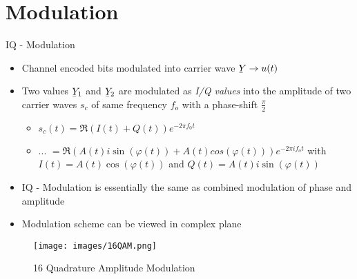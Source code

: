 \documentclass[xcolor=table,mathserif,9pt]{beamer}    %
\newcommand{\ubar}[1]{\underaccent{\bar}{#1}}
\begin{document}
\section{Modulation}%
\begin{frame}{IQ - Modulation}

\begin{itemize}
	\item Channel encoded bits modulated into carrier wave $\ubar{Y} \to u(t)$
	\item Two values $\ubar{Y}_1$ and $\ubar{Y}_2$ are modulated as \emph{I/Q values} into the amplitude of two carrier 
	      waves $s_c$ of same frequency $f_o$ with a phase-shift $\frac{\pi}{2}$
	\begin{itemize}
		\item $s_c(t) = \Re{(I(t) + Q(t))e^{-2\pi f_0 t}}$
		\item ... $ = \Re{(A(t)i\sin(\varphi(t)) + A(t)cos(\varphi(t)))e^{-2\pi i f_o t}}$ with $I(t) = A(t)\cos(\varphi(t))$ and $Q(t) = A(t)i\sin(\varphi(t))$
	\end{itemize}
	\item IQ - Modulation is essentially the same as combined modulation of phase and amplitude
	\item Modulation scheme can be viewed in complex plane
\end{itemize}

\begin{figure}[htpb]
	\centering
	\texttt{[image: images/16QAM.png]}
	\caption{16 Quadrature Amplitude Modulation \cite{CommTech}}
	\label{fig:16QAM}
\end{figure}
\end{frame}
\end{document}
